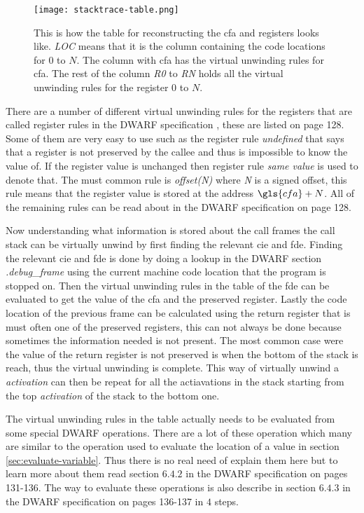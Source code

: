 \begin{figure}[h]
	\centering
	\texttt{[image: stacktrace-table.png]}
	\caption{This is how the table for reconstructing the \gls{cfa} and registers looks like. \emph{LOC} means that it is the column containing the code locations for $0$ to $N$. The column with \gls{cfa} has the virtual unwinding rules for \gls{cfa}. The rest of the column \emph{R0} to \emph{RN} holds all the virtual unwinding rules for the register $0$ to $N$.}
	\label{fig:stacktracetable}
\end{figure}


There are a number of different virtual unwinding rules for the registers that are called register rules in the \gls{DWARF} specification \cite{dwarf}, these are listed on page 128.
Some of them are very easy to use such as the register rule \emph{undefined} that says that a register is not preserved by the callee and thus is impossible to know the value of.
If the register value is unchanged then register rule \emph{same value} is used to denote that.
The must common rule is \emph{offset(N)} where \emph{N} is a signed offset, this rule means that the register value is stored at the address $\gls{cfa}+N$.
All of the remaining rules can be read about in the \gls{DWARF} specification \cite{dwarf} on page 128.


Now understanding what information is stored about the call frames the call stack can be virtually unwind by first finding the relevant \gls{cie} and \gls{fde}.
Finding the relevant \gls{cie} and \gls{fde} is done by doing a lookup in the \gls{DWARF} section \emph{.debug\_frame} using the current machine code location that the program is stopped on.
Then the virtual unwinding rules in the table of the \gls{fde} can be evaluated to get the value of the \gls{cfa} and the preserved register.
Lastly the code location of the previous frame can be calculated using the return register that is must often one of the preserved registers, this can not always be done because sometimes the information needed is not present.
The most common case were the value of the return register is not preserved is when the bottom of the stack is reach, thus the virtual unwinding is complete.
This way of virtually unwind a \emph{activation} can then be repeat for all the actiavations in the stack starting from the top \emph{activation} of the stack to the bottom one.


The virtual unwinding rules in the table actually needs to be evaluated from some special \gls{DWARF} operations.
There are a lot of these operation which many are similar to the operation used to evaluate the location of a value in section \ref{sec:evaluate-variable}.
Thus there is no real need of explain them here but to learn more about them read section $6.4.2$ in the \gls{DWARF} specification \cite{dwarf} on pages 131-136.
The way to evaluate these operations is also describe in section $6.4.3$ in the \gls{DWARF} specification \cite{dwarf} on pages 136-137 in $4$ steps.


